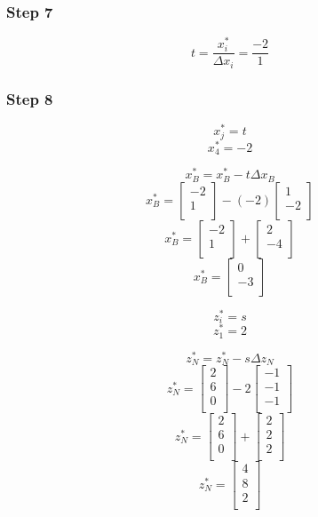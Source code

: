 \documentclass[14pt]{extarticle}
\begin{document}
\subsubsection*{Step 7}
\[
    t = \frac{x^*_i}{\Delta x_i} = \frac{-2}{1}
\]

\subsubsection*{Step 8}
\[
    x^*_j = t
\]
\[
    x^*_4 = -2
\]

\[
    x^*_B = x^*_B - t \Delta x_B
\]
\[
    x^*_B = \begin{bmatrix}
        -2 \\
        1 \\
    \end{bmatrix}
    - (-2) \begin{bmatrix}
        1 \\
        -2 \\
    \end{bmatrix}
\]
\[
    x^*_B = \begin{bmatrix}
        -2 \\
        1 \\
    \end{bmatrix}
    + \begin{bmatrix}
        2 \\
        -4 \\
    \end{bmatrix}
\]
\[
    x^*_B = \begin{bmatrix}
        0 \\
        -3 \\
    \end{bmatrix}
\]

\[
    z^*_i = s
\]
\[
    z^*_1 = 2
\]

\[
    z^*_N = z^*_N - s \Delta z_N
\]
\[
    z^*_N = \begin{bmatrix}
        2 \\
        6 \\
        0 \\
    \end{bmatrix}
    - 2 \begin{bmatrix}
        -1 \\
        -1 \\
        -1 \\
    \end{bmatrix}
\]
\[
    z^*_N = \begin{bmatrix}
        2 \\
        6 \\
        0 \\
    \end{bmatrix}
    + \begin{bmatrix}
        2 \\
        2 \\
        2 \\
    \end{bmatrix}
\]
\[
    z^*_N = \begin{bmatrix}
        4 \\
        8 \\
        2 \\
    \end{bmatrix}
\]
\end{document}
